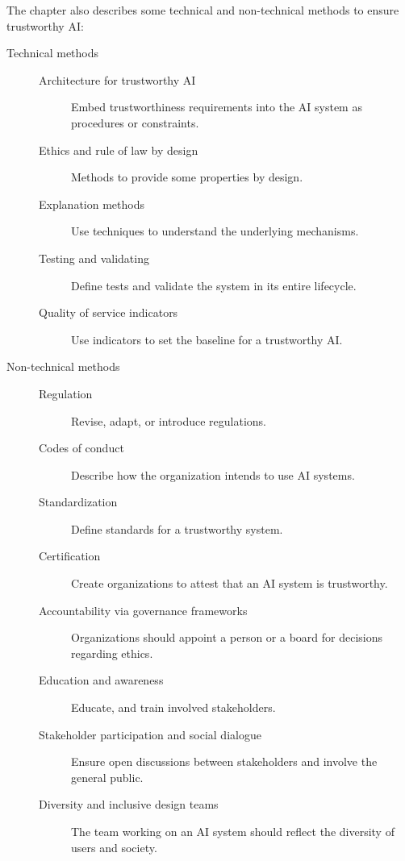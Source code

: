 The chapter also describes some technical and non-technical methods to ensure trustworthy AI:
\begin{description}
    \item[Technical methods] 
        \begin{description}
            \item[Architecture for trustworthy AI] 
                Embed trustworthiness requirements into the AI system as procedures or constraints.

            \item[Ethics and rule of law by design] 
                Methods to provide some properties by design.

            \item[Explanation methods] 
                Use techniques to understand the underlying mechanisms.

            \item[Testing and validating] 
                Define tests and validate the system in its entire lifecycle.

            \item[Quality of service indicators] 
                Use indicators to set the baseline for a trustworthy AI.
        \end{description}


    \item[Non-technical methods] 
        \begin{description}
            \item[Regulation] 
                Revise, adapt, or introduce regulations.

            \item[Codes of conduct] 
                Describe how the organization intends to use AI systems.

            \item[Standardization] 
                Define standards for a trustworthy system.

            \item[Certification] 
                Create organizations to attest that an AI system is trustworthy.

            \item[Accountability via governance frameworks] 
                Organizations should appoint a person or a board for decisions regarding ethics.

            \item[Education and awareness] 
                Educate, and train involved stakeholders.

            \item[Stakeholder participation and social dialogue] 
                Ensure open discussions between stakeholders and involve the general public.

            \item[Diversity and inclusive design teams] 
                The team working on an AI system should reflect the diversity of users and society.
        \end{description}
\end{description}



